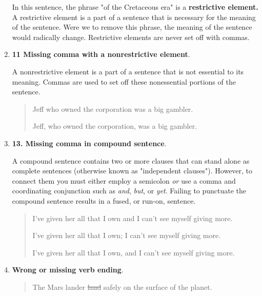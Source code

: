 \begin{enumerate}
\begin{quote}
\end{quote}

 In this sentence, the phrase "of the Cretaceous era" is a \textbf{restrictive element.} A restrictive element
is a part of a sentence that is necessary for the meaning of the sentence. Were we to remove this phrase, the meaning
of the sentence would radically change. Restrictive elements are never set off with commas. 

\item \textbf{11 Missing comma with a nonrestrictive element}.

A nonrestrictive element is a part of a sentence that is not essential to its meaning. Commas are used to set off these nonessential portions of the sentence.

\begin{quote}
Jeff who owned the corporation was a big gambler.      

Jeff, who owned the corporation, was a big gambler.      
\end{quote}





\item \textbf{13. Missing comma in compound sentence}.

A compound sentence contains two or more clauses that can stand alone as complete sentences (otherwise known as "independent clauses"). However, to connect them you must either employ a semicolon \emph{or} use a comma and coordinating conjunction such as \emph{and}, \emph{but}, or \emph{yet}. Failing to punctuate the compound sentence results in a fused, or run-on, sentence.

\begin{quote}
I've given her all that I own and I can't see myself giving more.  

I've given her all that I own; I can't see myself giving more.       

I've given her all that I own, and I can't see myself giving more.      

\end{quote}



\item \textbf{Wrong or missing verb ending}.

\begin{quote}
The Mars lander \sout{land} safely on the surface of the planet.      


\end{quote}
\end{enumerate}
